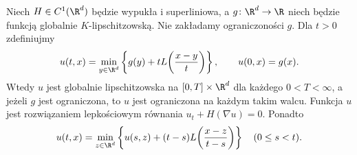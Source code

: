 \begin{twierdzenie}
\label{thm:pde23-hopflax}
Niech $H\in C^1(\R^d)$ będzie wypukła i superliniowa,
a $g\colon\R^d\to\R$ niech będzie funkcją
globalnie $K$-lipschitzowską. Nie zakładamy
ograniczoności $g$. Dla $t>0$ zdefiniujmy
\begin{equation}\label{eq:pde23-hopflax}
 u(t,x)=\min_{y\in\R^d}\left\{
 g(y)+tL\!\left(\frac{x-y}{t}\right)\right\},
 \qquad u(0,x)=g(x).
\end{equation}
Wtedy $u$ jest globalnie lipschitzowska
na $[0,T]\times\R^d$ dla każdego $0<T<\infty$,
a jeżeli $g$ jest ograniczona, to $u$ jest
ograniczona na każdym takim walcu.
Funkcja $u$ jest rozwiązaniem lepkościowym równania
$u_t+H(\nabla u)=0$. Ponadto
\begin{equation}\label{eq:pde23-dpp}
 u(t,x)=\min_{z\in\R^d}
 \left\{u(s,z)+(t-s)L\!\left(\frac{x-z}{t-s}\right)\right\}
 \quad (0\le s<t).
\end{equation}
\end{twierdzenie}
